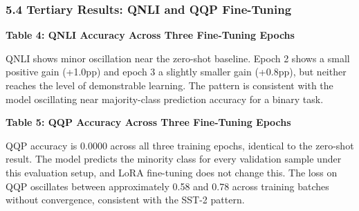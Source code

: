 \subsubsection{5.4 Tertiary Results: QNLI and QQP Fine-Tuning}

\textbf{Table 4: QNLI Accuracy Across Three Fine-Tuning Epochs}

\begin{table}[htbp]
\centering
{}
\end{table}

QNLI shows minor oscillation near the zero-shot baseline. Epoch 2 shows a small positive gain (+1.0pp) and epoch 3 a slightly smaller gain (+0.8pp), but neither reaches the level of demonstrable learning. The pattern is consistent with the model oscillating near majority-class prediction accuracy for a binary task.

\textbf{Table 5: QQP Accuracy Across Three Fine-Tuning Epochs}

\begin{table}[htbp]
\centering
{}
\end{table}

QQP accuracy is 0.0000 across all three training epochs, identical to the zero-shot result. The model predicts the minority class for every validation sample under this evaluation setup, and LoRA fine-tuning does not change this. The loss on QQP oscillates between approximately 0.58 and 0.78 across training batches without convergence, consistent with the SST-2 pattern.

